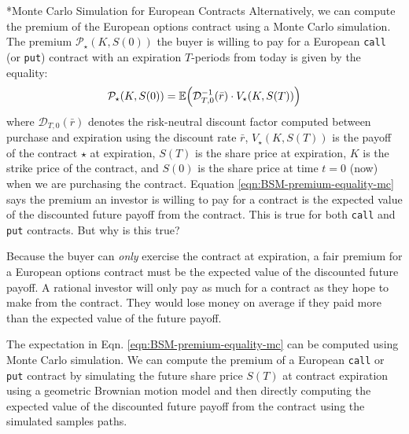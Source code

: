 \documentclass[11pt]{article}
\makeatletter
\theoremstyle{definition}
\renewcommand\subsubsection{\@startsection
	{subsubsection}{2}{0mm}
	{-0.05in}
	{-0.5\baselineskip}
	{\normalfont\normalsize\itshape\bfseries}}
\makeatother
\begin{document}
\subsubsection*{Monte Carlo Simulation for European Contracts}
Alternatively, we can compute the premium of the European options contract using a Monte Carlo simulation.
The premium $\mathcal{P}_{\star}(K,S(0))$ the buyer is willing to pay for a European \texttt{call} (or \texttt{put}) contract with an expiration $T$-periods from today is given by the equality:
\begin{equation}\label{eqn:BSM-premium-equality-mc}
\mathcal{P}_{\star}(K,S(0)) = \mathbb{E}\Bigl(\mathcal{D}^{-1}_{T,0}(\bar{r})\cdot{V_{\star}}(K,S(T))\Bigr)
\end{equation}
where $\mathcal{D}_{T,0}(\bar{r})$ denotes the risk-neutral discount factor computed between purchase and expiration using the discount rate $\bar{r}$, $V_{\star}(K, S(T))$ is the payoff of the contract $\star$ at expiration, $S(T)$ is the share price at expiration, $K$ is the strike price of the contract, and $S(0)$ is the share price at time $t=0$ (now) when we are purchasing the contract. Equation \ref{eqn:BSM-premium-equality-mc} says the premium an investor is willing to pay for a contract is the expected value of the discounted future payoff from the contract. This is true for both \texttt{call} and \texttt{put} contracts. But why is this true?

\begin{concept}
Because the buyer can \textit{only} exercise the contract at expiration, a fair premium for a European options contract must be the expected value of the discounted future payoff. A rational investor will only pay as much for a contract as they hope to make from the contract. 
They would lose money on average if they paid more than the expected value of the future payoff.
\end{concept}
The expectation in Eqn. \ref{eqn:BSM-premium-equality-mc} can be computed using Monte Carlo simulation.
We can compute the premium of a European \texttt{call} or \texttt{put} contract by simulating the future share price $S(T)$ at contract expiration
using a geometric Brownian motion model and then directly computing the expected value of the discounted future payoff from the contract 
using the simulated samples paths. 
\end{document}
